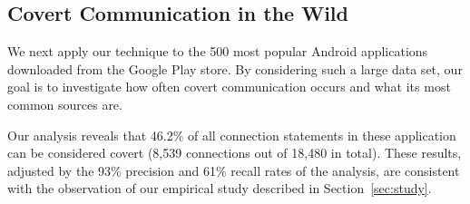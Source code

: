 \subsection{Covert Communication in the Wild}
We next apply our technique to the 500 most popular Android applications
downloaded from the Google Play store. By considering such a large data set, our goal is to
investigate how often covert communication occurs and what its most common sources are.








Our analysis reveals that 46.2\% of all connection statements in these application can be considered covert (8,539 connections out of 18,480 in total).
These results, adjusted by the 93\% precision and 61\% recall rates of the analysis, are consistent with the observation of our empirical study described in Section~\ref{sec:study}.

